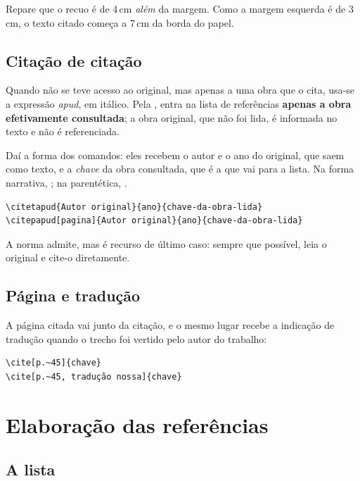 \documentclass[dsc]{ufrj}
\begin{document}
  Repare que o recuo é de 4\,cm \emph{além} da margem. Como a margem esquerda é
  de 3\,cm, o texto citado começa a 7\,cm da borda do papel.

  \section{Citação de citação}

  Quando não se teve acesso ao original, mas apenas a uma obra que o cita, usa-se
  a expressão \emph{apud}, em itálico. Pela , entra na lista de
  referências \textbf{apenas a obra efetivamente consultada}; a obra original,
  que não foi lida, é informada no texto e não é referenciada.

  Daí a forma dos comandos: eles recebem o autor e o ano do original, que saem
  como texto, e a \emph{chave} da obra consultada, que é a que vai para a lista.
  Na forma narrativa, ; na
  parentética, .

\begin{verbatim}
\citetapud{Autor original}{ano}{chave-da-obra-lida}
\citepapud[pagina]{Autor original}{ano}{chave-da-obra-lida}
\end{verbatim}

  A norma admite, mas é recurso de último caso: sempre que possível, leia o
  original e cite-o diretamente.

  \section{Página e tradução}

  A página citada vai junto da citação, e o mesmo lugar recebe a indicação de
  tradução quando o trecho foi vertido pelo autor do trabalho:

\begin{verbatim}
\cite[p.~45]{chave}
\cite[p.~45, tradução nossa]{chave}
\end{verbatim}

  \chapter{Elaboração das referências}\label{cap:referencias}

  \section{A lista}
\end{document}
